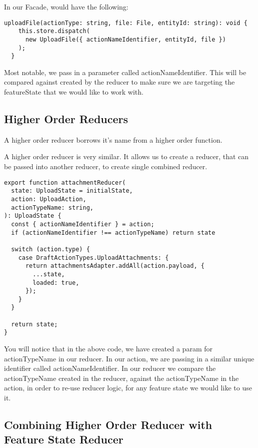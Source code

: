 In our Facade, would have the following:

\begin{lstlisting}
uploadFile(actionType: string, file: File, entityId: string): void {
    this.store.dispatch(
      new UploadFile({ actionNameIdentifier, entityId, file })
    );
  }
\end{lstlisting}

Most notable, we pass in a parameter called actionNameIdentifier. This will be
compared against created by the reducer to make sure we are targeting the
featureState that we would like to work with.

\subsection{Higher Order Reducers}

A higher order reducer borrows it's name from a higher order function.


A higher order reducer is very similar. It allows us to create a reducer, that
can be passed into another reducer, to create single combined reducer.

\begin{lstlisting}
export function attachmentReducer(
  state: UploadState = initialState,
  action: UploadAction,
  actionTypeName: string,
): UploadState {
  const { actionNameIdentifier } = action;
  if (actionNameIdentifier !== actionTypeName) return state

  switch (action.type) {
    case DraftActionTypes.UploadAttachments: {
      return attachmentsAdapter.addAll(action.payload, {
        ...state,
        loaded: true,
      });
    }
  }

  return state;
}
\end{lstlisting}

You will notice that in the above code, we have created a param for
actionTypeName in our reducer. In our action, we are passing in a similar unique
identifier called actionNameIdentifier. In our reducer we compare the
actionTypeName created in the reducer, against the actionTypeName in the action,
in order to re-use reducer logic, for any feature state we would like to use it.

\subsection{Combining Higher Order Reducer with Feature State Reducer }

